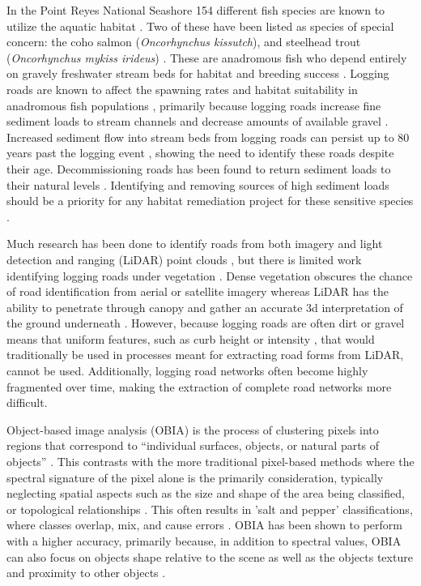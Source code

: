 \documentclass[remotesensing,article,submit,pdftex,moreauthors]{Definitions/mdpi}
\begin{document}
In the Point Reyes National Seashore 154 different fish species are known to utilize the aquatic habitat \cite{kelly}. Two of these have been listed as species of special concern: the coho salmon ({\it Oncorhynchus kissutch}), and steelhead trout ({\it Oncorhynchus mykiss irideus}) \cite{ketcham}. These are anadromous fish who depend entirely on gravely freshwater stream beds for habitat and breeding success \cite{gronsdahl}. Logging roads are known to affect the spawning rates and habitat suitability in anadromous fish populations \cite{jacob}, primarily because logging roads increase fine sediment loads to stream channels and decrease amounts of available gravel \cite{baxter}. Increased sediment flow into stream beds from logging roads can persist up to 80 years past the logging event \cite{moore}, showing the need to identify these roads despite their age. Decommissioning roads has been found to return sediment loads to their natural levels \cite{ahnert, douglas}. Identifying and removing sources of high sediment loads should be a priority for any habitat remediation project for these sensitive species \cite{gronsdahl, jacob}.  

Much research has been done to identify roads from both imagery and light detection and ranging (LiDAR) point clouds \cite{li, yong, lillesand, mena, wang, white, yucong}, but there is limited work identifying logging roads under vegetation \cite{sherba}. Dense vegetation obscures the chance of road identification from aerial or satellite imagery \cite{wang} whereas LiDAR has the ability to penetrate through canopy and gather an accurate 3d interpretation of the ground underneath \cite{stoker}. However, because logging roads are often dirt or gravel means that uniform features, such as curb height \cite{li} or intensity \cite{yong}, that would traditionally be used in processes meant for extracting road forms from LiDAR, cannot be used. Additionally, logging road networks often become highly fragmented over time, making the extraction of complete road networks more difficult. 

Object-based image analysis (OBIA) is the process of clustering pixels into regions that correspond to “individual surfaces, objects, or natural parts of objects” \cite[p.~576]{preetha}. This contrasts with the more traditional pixel-based methods where the spectral signature of the pixel alone is the primarily consideration, typically neglecting spatial aspects such as the size and shape of the area being classified, or topological relationships \cite{khatami}. This often results in 'salt and pepper' classifications, where classes overlap, mix, and cause errors \cite{lu}. OBIA has been shown to perform with a higher accuracy, primarily because, in addition to spectral values, OBIA can also focus on objects shape relative to the scene as well as the objects texture and proximity to other objects \cite{karami}.
\end{document}
